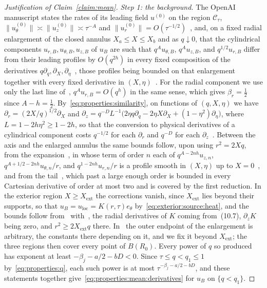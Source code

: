 \documentclass[11pt,reqno]{amsproc}
\numberwithin{equation}{section}
\theoremstyle{remark}
\newcommand{\p}{\partial}
\begin{document}
\begin{proof}[Justification of Claim~\ref{claim:mean}]
\smallskip
\noindent\emph{Step 1: the background.} The OpenAI manuscript states the rates of its leading field $u^{(0)}$ on the region $\mathcal C_\tau$, $\|u^{(0)}_\theta\|\asymp\|u^{(0)}_z\|\asymp\tau^{-A}$ and $\|u^{(0)}_r\|=O(\tau^{-1/2})$~\cite[p.~8]{OpenAIManuscript}, and, on a fixed radial enlargement of the closed annulus $X_a\le X\le X_b$ and as $q\downarrow0$, that the cylindrical components $u_{r,B},u_{\theta,B},u_{z,B}$ of $u_B$ are such that $q^Au_{\theta,B}$, $q^Au_{z,B}$, and $q^{1/2}u_{r,B}$ differ from their leading profiles by $O(q^{2h})$ in every fixed composition of the derivatives $q\p_q,\p_X,\p_\eta$~\cite[equation~(5.42), p.~60]{OpenAIManuscript}, those profiles being bounded on that enlargement together with every fixed derivative in $(X,\eta)$~\cite[Theorem~4.6(i), p.~33]{OpenAIManuscript}. For the radial component we use only the last line of~\cite[equation~(5.42), p.~60]{OpenAIManuscript}, $q^Au_{r,B}=O(q^h)$ in the same sense, which gives $\beta_r=\frac12$ since $A-h=\frac12$. By~\eqref{eq:properties:similarity}, on functions of $(q,X,\eta)$ we have $\p_r=(2X/q)^{1/2}\p_X$ and $\p_z=q^{-D}L^{-1}\bigl(2\eta q\p_q-2\eta X\p_X+(1-\eta^2)\p_\eta\bigr)$, where $L=1-2h\eta^2\ge1-2h$, so that the conversion to physical derivatives of a cylindrical component costs $q^{-1/2}$ for each $\p_r$ and $q^{-D}$ for each $\p_z$~\cite[equation~(5.26), p.~55]{OpenAIManuscript}. Between the axis and the enlarged annulus the same bounds follow, upon using $r^2=2Xq$, from the expansion~\cite[equation~(5.1), p.~46]{OpenAIManuscript}, in whose term of order $n$ each of $q^{A-2nh}u_{z,n}$, $q^{A+1/2-2nh}u_{\theta,n}/r$, and $q^{1-2nh}u_{r,n}/r$ is a profile smooth in $(X,\eta)$ up to $X=0$~\cite[Theorem~4.6(i), p.~33, and equation~(5.17), p.~52]{OpenAIManuscript}, and from the tail~\cite[equations~(5.34)--(5.35), pp.~57--58]{OpenAIManuscript}, which past a large enough order is bounded in every Cartesian derivative of order at most two and is covered by the first reduction. In the exterior region $X\ge X_{\mathrm{ext}}$ the corrections vanish, since $X_{\mathrm{ext}}$ lies beyond their supports, so that $u_B=u_{\mathrm{loc}}=K(r,\tau)e_\theta$ by~\eqref{eq:exterior:source:heat}, and the bounds follow from~\cite[equation~(3.5), p.~15]{OpenAIManuscript} with~\cite[equations~(10.7)--(10.8), p.~119]{OpenAIManuscript}, the radial derivatives of $K$ coming from~(10.7), $\p_zK$ being zero, and $r^2\ge2X_{\mathrm{ext}}q$ there. In~\cite[Proposition~5.5, p.~60]{OpenAIManuscript} the outer endpoint of the enlargement is arbitrary, the constants there depending on it, and we fix it beyond $X_{\mathrm{ext}}$; the three regions then cover every point of $B(R_0)$. Every power of $q$ so produced has exponent at least $-\beta_j-a/2-bD<0$. Since $\tau\le q<q_1\le1$ by~\eqref{eq:properties:q}, each such power is at most $\tau^{-\beta_j-a/2-bD}$, and these statements together give~\eqref{eq:properties:mean:derivatives} for $u_B$ on $\{q<q_1\}$.


\end{proof}
\end{document}
